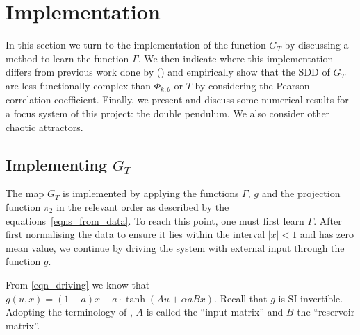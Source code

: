\documentclass[a4paper,12pt,twoside]{report}
\newtheorem{Definition}{Definition}[]
\begin{document}





\chapter{Implementation} \label{ch5}
 
In this section we turn to the implementation of the function $G_T$ by discussing a method to learn the function $\Gamma$. We then indicate where this implementation differs from previous work done by (\cite{manjunath2021universal}) and empirically show that the SDD of $G_T$ are less functionally complex than $\Phi_{k, \theta}$ or $T$ by considering the Pearson correlation coefficient. 
Finally, we present and discuss some numerical results for a focus system of this project: the double pendulum. We also consider other chaotic attractors.

\section{Implementing $G_T$}
The map $G_T$ is implemented by applying the functions $\Gamma$, $g$ and the projection function $\pi_2$ in the relevant order as described by the equations~\ref{eqns_from_data}. To reach this point, one must first learn $\Gamma$.
After first normalising the data to ensure it lies within the interval $|x| < 1$ and has zero mean value, we continue by driving the system with external input through the function $g$.

From \eqref{eqn_driving} we know that $ g(u,x)=(1-a)x+a{\cdot}\tanh(Au+\alpha{a}Bx)$. Recall that $g$ is SI-invertible. Adopting the terminology of \cite{manjunath2021universal}, $A$ is called the “input matrix” and $B$ the “reservoir matrix”. 
\end{document}

